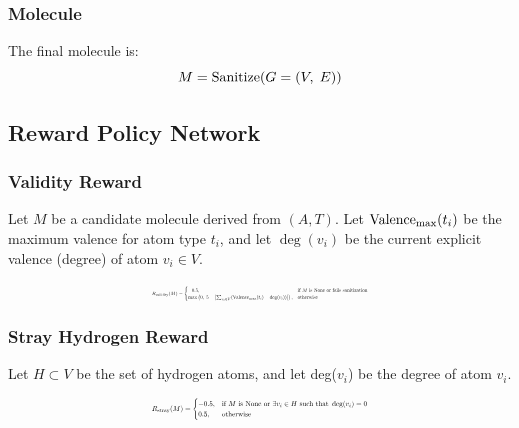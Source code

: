 \documentclass[conference]{IEEEtran}
\begin{document}
\subsubsection{Molecule}
\textnormal{The final molecule is:}
\begin{equation}
    M = \textnormal{Sanitize}(G = (V,\; E))
    \label{eq:molecule}
\end{equation}

\subsection{Reward Policy Network}
\subsubsection{Validity Reward}
Let $M$ be a candidate molecule derived from $(A, T)$. Let $\textnormal{Valence}_{\max}(t_i)$ be the maximum valence 
for atom type $t_i$, and let $\deg(v_i)$ be the current explicit valence (degree) of atom $v_i \in V$.

\begin{equation}
    \resizebox{0.45\textwidth}{!}{$
        R_{\textnormal{validity}}(M) = 
        \begin{cases}
            -0.5, & \textnormal{if } M \textnormal{ is None or fails sanitization} \\
            \max\left(0,\; 5 - \left|\sum_{v_i \in V}(\textnormal{Valence}_{\max}(t_i) - \deg(v_i))\right|\right), & \textnormal{otherwise}
        \end{cases}
    $}
    \label{eq:validity}
\end{equation}

\subsubsection{Stray Hydrogen Reward}
Let $H \subset V$ be the set of hydrogen atoms, and let deg($v_i$) be the degree of atom $v_i$.

\small{
    \begin{equation}
        \resizebox{0.45\textwidth}{!}{$
            R_{\textnormal{stray}}(M) = 
            \begin{cases}
                -0.5, & \textnormal{if } M \textnormal{ is None or } \exists v_i \in H \textnormal{ such that } \deg(v_i) = 0 \\
                0.5, & \textnormal{otherwise}
            \end{cases}
        $}
        \label{eq:stray}
    \end{equation}
}    
\end{document}
